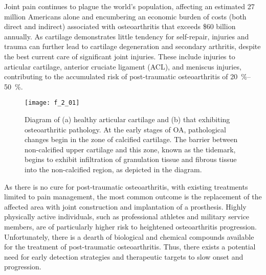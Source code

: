 \begin{refsection}
Joint pain continues to plague the world's population, affecting an
estimated 27 million Americans alone and encumbering an economic burden of costs
(both direct and indirect) associated with osteoarthritis that exceeds \$60
billion annually.\cite{Brown} As cartilage demonstrates little tendency for
self-repair, injuries and trauma can further lead to cartilage degeneration and
secondary arthritis, despite the best current care of significant joint
injuries.\cite{Helmerhorst2014} These include injuries to articular cartilage,
anterior cruciate ligament (ACL), and meniscus injuries, contributing to the
accumulated risk of post-traumatic osteoarthritis of
\SIrange{20}{50}{\percent}.\cite{Roos1995,Anderson2011,Reiersen1998,Buckwalter2006}
\begin{figure}[h!] \centering \texttt{[image: f\_2\_01]}
    \caption[Diagram of (a) healthy articular cartilage and (b) that exhibiting
        osteoarthritic pathology. At the early stages of OA, pathological
        changes begin in the zone of calcified cartilage. The barrier between
        non-calcified upper cartilage and this zone, known as the tidemark,
        begins to exhibit infiltration of granulation tissue and fibrous tissue
    into the non-calcified region, as depicted in the diagram.]{Diagram of (a)
        healthy articular cartilage and (b) that exhibiting osteoarthritic
        pathology. At the early stages of OA, pathological changes begin in the
        zone of calcified cartilage. The barrier between non-calcified upper
        cartilage and this zone, known as the tidemark, begins to exhibit
        infiltration of granulation tissue and fibrous tissue into the
        non-calcified region, as depicted in the
        diagram.\cite{Wieland2005}}\label{fig:bone_diagram_1} \end{figure}
As there is no cure for post-traumatic osteoarthritis, with existing treatments
limited to pain management, the most common outcome is the replacement of the
affected area with joint construction and implantation of a prosthesis. Highly
physically active individuals, such as professional athletes and military
service members, are of particularly higher risk to heightened osteoarthritis
progression.\cite{Cameron2011} Unfortunately, there is a dearth of biological
and chemical compounds available for the treatment of post-traumatic
osteoarthritis. Thus, there exists a potential need for early detection
strategies and therapeutic targets to slow onset and progression.


\end{refsection}
